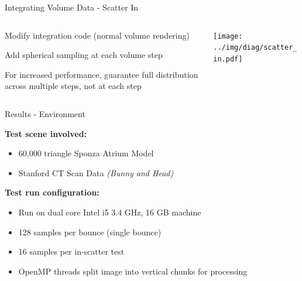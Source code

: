 \documentclass[10pt,compress,professionalfont]{beamer}
\begin{document}
\begin{frame}{Integrating Volume Data - Scatter In}

    \begin{columns}
        \begin{column}{0.5\textwidth}

            Modify integration code (normal volume rendering)\\
            \vspace{8mm}

            Add spherical sampling at each volume step\\
            \vspace{8mm}

            For increased performance, guarantee full distribution across multiple steps, not at each step

        \end{column}
        \begin{column}{0.5\textwidth}
            \texttt{[image: ../img/diag/scatter\_in.pdf]}\\
        \end{column}
    \end{columns}

\end{frame}




\begin{frame}{Results - Environment}

    {\bf Test scene involved:}
    \begin{itemize}
        \item 60,000 triangle Sponza Atrium Model\\
        \vspace{2mm}
        \item Stanford CT Scan Data \textit{(Bunny and Head)}
        \vspace{2mm}
    \end{itemize}
    
    {\bf Test run configuration:}
    \begin{itemize}
        \item Run on dual core Intel i5 3.4 GHz, 16 GB machine\\
        \vspace{2mm}
        \item 128 samples per bounce (single bounce)\\
        \vspace{2mm}
        \item 16 samples per in-scatter test\\
        \vspace{2mm}
        \item OpenMP threads split image into vertical chunks for processing\\
    \end{itemize}
\end{frame}
\end{document}
